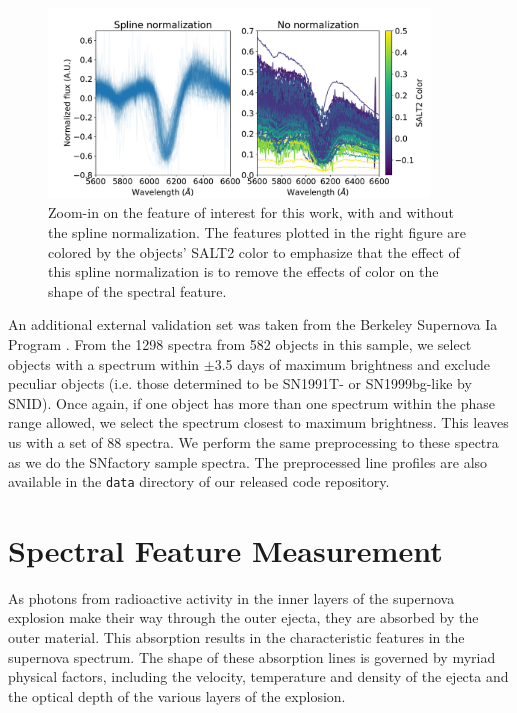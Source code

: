 \begin{figure}[!htb]
    \centering
    \includegraphics[width=0.9\textwidth]{figures/si_feat_pca/compare_spline_norm.pdf}
    \caption{Zoom-in on the feature of interest for this work, with and without the spline normalization. The features plotted in the right figure are colored by the objects' SALT2 color to emphasize that the effect of this spline normalization is to remove the effects of color on the shape of the spectral feature.}
    \label{compare_spline_norm}
\end{figure}

An additional external validation set was taken from the Berkeley Supernova Ia Program \citep[BSNIP,][]{silverman_berkeley_2012}. From the 1298 spectra from 582 objects in this sample, we select objects with a spectrum within $\pm$3.5 days of maximum brightness and exclude peculiar objects (i.e. those determined to be SN1991T- or SN1999bg-like by SNID). Once again, if one object has more than one spectrum within the phase range allowed, we select the spectrum closest to maximum brightness. This leaves us with a set of 88 spectra. We perform the same preprocessing to these spectra as we do the SNfactory sample spectra. The preprocessed line profiles are also available in the \verb|data| directory of our released code repository.

\section{Spectral Feature Measurement}
\label{spectral_features}
As photons from radioactive activity in the inner layers of the supernova explosion make their way through the outer ejecta, they are absorbed by the outer material. This absorption results in the characteristic features in the supernova spectrum. The shape of these absorption lines is governed by myriad physical factors, including the velocity, temperature and density of the ejecta and the optical depth of the various layers of the explosion.

